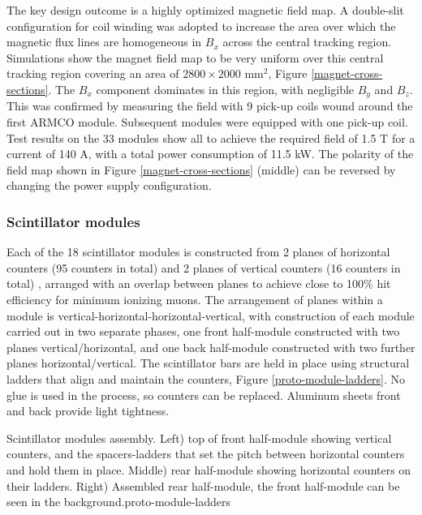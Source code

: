 The key design outcome is a highly optimized magnetic field map. A double-slit configuration for coil winding was adopted to increase the area over which the magnetic flux lines are homogeneous in $B_x$ across the central tracking region. Simulations show the magnet field map to be very uniform over this central tracking region covering an area of $2800\times2000$ mm$^2$, Figure \ref{magnet-cross-sections}. The $B_x$ component dominates in this region, with negligible $B_y$ and $B_z$. This was confirmed by measuring the field with 9 pick-up coils wound around the first ARMCO module. Subsequent modules were equipped with one pick-up coil. Test results on the 33 modules show all to achieve the required field of 1.5 T for a current of 140 A, with a total power consumption of 11.5 kW. The polarity of the field map shown in Figure \ref{magnet-cross-sections} (middle) can be reversed by changing the power supply configuration.

\subsubsection{Scintillator modules}
Each of the 18 scintillator modules is constructed from 2 planes of horizontal counters (95 counters in total) and 2 planes of vertical counters (16 counters in total) \cite{Antonova:2017tuf}, arranged with an overlap between planes to achieve close to 100\% hit efficiency for minimum ionizing muons. The arrangement of planes within a module is vertical-horizontal-horizontal-vertical, with construction of each module carried out in two separate phases, one front half-module constructed with two planes vertical/horizontal, and one back half-module constructed with two further planes horizontal/vertical. The scintillator bars are held in place using structural ladders that align and maintain the counters, Figure \ref{proto-module-ladders}. No glue is used in the process, so counters can be replaced. Aluminum sheets front and back provide light tightness.

 {Scintillator modules assembly. Left) top of front half-module showing vertical counters, and the spacers-ladders that set the pitch between horizontal counters and hold them in place. Middle) rear half-module showing horizontal counters on their ladders. Right) Assembled rear half-module, the front half-module can be seen in the background.}{proto-module-ladders}

